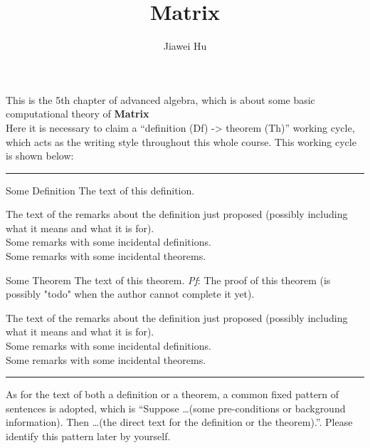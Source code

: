 \documentclass{article}
\title{\LARGE \textbf{Matrix}}
\author{\large Jiawei Hu}
\begin{document}
\maketitle

This is the 5th chapter of advanced algebra, which is about some basic computational theory of \textbf{Matrix}\\
Here it is necessary to claim a ``definition (Df) -> theorem (Th)'' working cycle, which acts as the writing style throughout this whole course. This working cycle is shown below:

\noindent\rule{\textwidth}{2pt}
\begin{Df}{Some Definition}
    The text of this definition.
\end{Df}

\begin{Rmk}{}
    The text of the remarks about the definition just proposed (possibly including what it means and what it is for).\\
    \textcolor{Df}{Some remarks with some incidental definitions.}\\
    \textcolor{Th}{Some remarks with some incidental theorems.}
\end{Rmk}

\begin{Th}{Some Theorem}
    The text of this theorem.
    \tcblower
    \textit{Pf}: The proof of this theorem (is possibly "todo" when the author cannot complete it yet).
\end{Th}

\begin{Rmk}{}
    The text of the remarks about the definition just proposed (possibly including what it means and what it is for).\\
    \textcolor{Df}{Some remarks with some incidental definitions.}\\
    \textcolor{Th}{Some remarks with some incidental theorems.}
\end{Rmk}
\noindent\rule{\textwidth}{2pt}
As for the text of both a definition or a theorem, a common fixed pattern of sentences is adopted, which is ``Suppose \dots (some pre-conditions or background information). Then \dots (the direct text for the definition or the theorem).''. Please identify this pattern later by yourself. 
\end{document}

